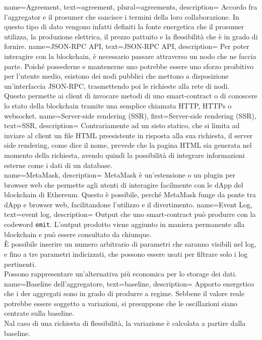 {
    name={Agreement},
    text={agreement},
    plural={agreements},
    description={
            Accordo fra l'\gls{aggregator} e il \gls{prosumer} che sancisce i termini della loro collaborazione.
            In questo tipo di dato vengono infatti definiti la fonte energetica che il \gls{prosumer} utilizza,
            la produzione elettrica, il prezzo pattuito e la flessibilità che è in grado di fornire.
        }
}
{
    name={JSON-RPC API},
    text={JSON-RPC API},
    description={
            Per poter interagire con la blockchain, è necessario passare attraverso un nodo che ne faccia parte.
            Poiché possederne e mantenerne uno potrebbe essere uno sforzo proibitivo per l'utente medio, esistono dei nodi pubblici
            che mettono a disposizione un'interfaccia JSON-RPC, trasmettendo poi le richieste alla rete di nodi. \\
            Questo permette ai client di invocare metodi di uno \gls{smart-contract} o di conoscere lo stato della blockchain tramite una semplice chiamata HTTP, HTTPs o websocket.
        }
}
{
    name={Server-side rendering (SSR)},
    first={Server-side rendering (SSR)},
    text={SSR},
    description={
            Contrariamente ad un sisto statico, che si limita ad inviare al client un file HTML preesistente in risposta alla sua richiesta,
            il server side rendering, come dice il nome, prevede che la pagina HTML sia generata nel momento della richiesta, avendo quindi la possibilità di integrare informazioni esterne come i dati di un database. \\
        }
}
{
    name={MetaMask},
    description={
            MetaMask è un'estensione o un plugin per browser web che permette agli utenti di interagire facilmente con le dApp del blockchain di Ethereum.
            Questo è possibile, perché MetaMask funge da ponte tra dApp e browser web, facilitandone l'utilizzo e il divertimento.}
}
{
    name={Event Log},
    text={event log},
    description={
            Output che uno \gls{smart-contract} può produrre con la codeword \texttt{emit}.
            L'output prodotto viene aggiunto in maniera permanente alla blockchain e può essere consultato da chiunque. \\
            È possibile inserire un numero arbitrario di parametri che saranno visibili nel log, e fino a tre parametri indicizzati,
            che possono essere usati per filtrare solo i log pertinenti. \\
            Possono rappresentare un'alternativa più economica per lo storage dei dati.
        }
}
{
    name={Baseline dell'aggregatore},
    text={baseline},
    description={
            Apporto energetico che i \gls{der} aggregati sono in grado di produrre a regime.
            Sebbene il valore reale potrebbe essere soggetto a variazioni, si presuppone che le oscillazioni siano centrate sulla baseline. \\
            Nal caso di una richiesta di flessibilità, la variazione è calcolata a partire dalla baseline.
        }
}